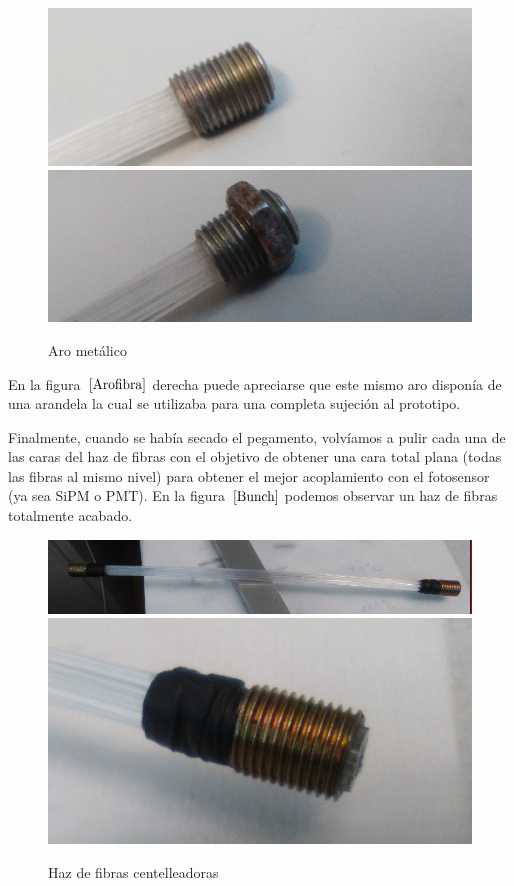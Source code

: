 \begin{figure}[htb]
\centering
{
\includegraphics[scale=0.4]{arometalico.png} 
}
{
\includegraphics[scale=0.4]{arometalicoconrosca.png} 
}
\caption{Aro metálico\label{Arofibra}}
\end{figure} 

En la figura~$\ref{Arofibra}$ derecha puede apreciarse que este mismo aro disponía de una arandela la cual se utilizaba para una completa sujeción al prototipo.

Finalmente, cuando se había secado el pegamento, volvíamos a pulir cada una de las caras del haz de fibras con el objetivo de obtener una cara total plana (todas las fibras al mismo nivel) para obtener el mejor acoplamiento con el fotosensor (ya sea SiPM o PMT). En la figura~$\ref{Bunch}$ podemos observar un  haz de fibras totalmente acabado.

\begin{figure}[htb]
\centering
{
\includegraphics[scale=0.33]{bunchfibras.png} 
}
{
\includegraphics[scale=0.33]{bunchfibras1.png} 
}
\caption{Haz de fibras centelleadoras\label{Bunch}}
\end{figure} 

